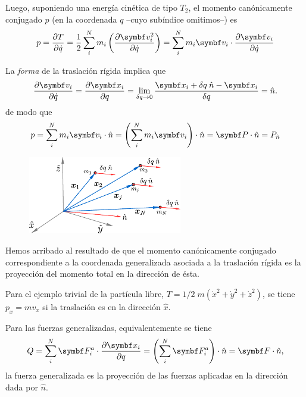 \documentclass[10pt,oneside]{CBFT_book}
\begin{document}
Luego, suponiendo una energía cinética de tipo $T_2$, el momento canónicamente conjugado $ p $ (en 
la coordenada $q$ --cuyo subíndice omitimos--) es
\[
	p = \dpar{T}{\dot{q}} = \frac{1}{2} \sum_i^N m_i \left( \dpar{\vb{v}_i^2}{\dot{q}}\right) =
	\sum_i^N m_i \vb{v}_i \cdot \dpar{\vb{v}_i}{\dot{q}} 
\]

La {\it forma} de la traslación rígida implica que 
\[
	\dpar{\vb{v}_i}{\dot{q}} = \dpar{\vb{x}_i}{q} = 
	\lim_{\delta q \to 0} \frac{\vb{x}_i + \delta q \:\hat{n} -\vb{x}_i}{\delta q} = \hat{n}.
\]
de modo que 
\[
	p = \sum_i^N m_i \vb{v}_i \cdot \hat{n} = \left( \sum_i^N m_i \vb{v}_i \right) \cdot \hat{n} 
	= \vb{P} \cdot \hat{n} = P_{\hat{n}}
\]

\begin{figure}[htb]
	\begin{center}
	\includegraphics[width=0.6\textwidth]{images/fig_mc_tras_rig.pdf}	 
	\end{center}
	\caption{}
	\label{traslacion_rigida}
\end{figure} 

Hemos arribado al resultado de que el momento canónicamente conjugado correspondiente a la coordenada
generalizada asociada a la traslación rígida es la proyección del momento total en la dirección de ésta.

Para el ejemplo trivial de la partícula libre, $T = 1/2 \; m (\dot{x}^2+ \dot{y}^2+\dot{z}^2)$, se
tiene $ p_x = m v_x $ si la traslación es en la dirección $ \hat{x} $.

Para las fuerzas generalizadas, equivalentemente se tiene 
\[
	Q = \sum_i^N \vb{F}^a_i \cdot \dpar{\vb{x}_i}{q} =
	\left( \sum_i^N \vb{F}^a_i \right) \cdot \hat{n} = \vb{F}\cdot \hat{n},
\]
la fuerza generalizada es la proyección de las fuerzas aplicadas en la dirección dada por $ \hat{n} $.
\end{document}
